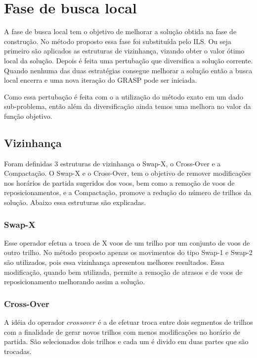  \section{Fase de busca local}
 
A fase de busca local tem o objetivo de melhorar a solução obtida na fase de construção. No método proposto essa fase foi substituída pelo ILS. Ou seja primeiro são aplicados as estruturas de vizinhança, vizando obter o valor ótimo local da solução. Depois é feita uma pertubação que diversifica a solução corrente. Quando nenhuma das duas estratégias consegue melhorar a solução então a busca local encerra e uma nova iteração do GRASP pode ser iniciada.

Como essa pertubação é feita com o a utilização do método exato em um dado sub-problema, então além da diversificação ainda temos uma melhora no valor da função objetivo.
 
 \subsection{Vizinhança}
 
 Foram definidas 3 estruturas de vizinhança o Swap-X, o Cross-Over e a Compactação. O Swap-X e o Cross-Over, tem o objetivo de remover modificações nos horários de partida sugeridos dos voos, bem como a remoção de voos de reposicionamentos, e a Compactação, promove a redução do número de trilhos da solução. Abaixo essa estruturas são explicadas.
 
\subsubsection{Swap-X}

Esse operador efetua a troca de X voos de um trilho por um conjunto de voos de outro trilho. No método proposto apenas os movimentos do tipo Swap-1 e Swap-2 são utilizados, pois essa vizinhança apresentou melhores resultados. Essa modificação, quando bem utilizada, permite a remoção de atrasos e de voos de reposicionamento melhorando assim a solução.
 
 \subsubsection{Cross-Over}
 
 A idéia do operador $crossover$ é a de efetuar troca entre dois segmentos de trilhos com a finalidade de gerar novos trilhos com menos modificações no horário de partida. São selecionados dois trilhos e cada um é divido em duas partes que são trocadas.
 
